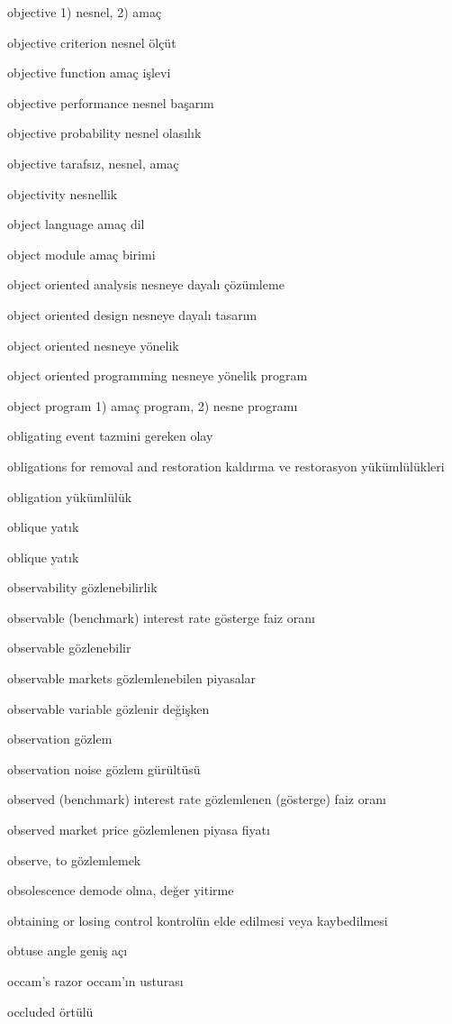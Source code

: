 \documentclass[12pt,fleqn]{article}\usepackage{../../common}
\begin{document}
objective 1) nesnel, 2) amaç

objective criterion nesnel ölçüt

objective function amaç işlevi

objective performance nesnel başarım

objective probability nesnel olasılık

objective tarafsız, nesnel, amaç

objectivity nesnellik

object language amaç dil

object module amaç birimi

object oriented analysis nesneye dayalı çözümleme

object oriented design nesneye dayalı tasarım

object oriented nesneye yönelik

object oriented programming nesneye yönelik program

object program 1) amaç program, 2) nesne programı

obligating event tazmini gereken olay

obligations for removal and restoration kaldırma ve restorasyon yükümlülükleri

obligation yükümlülük

oblique yatık

oblique yatık

observability gözlenebilirlik

observable (benchmark) interest rate gösterge faiz oranı

observable gözlenebilir

observable markets gözlemlenebilen piyasalar

observable variable gözlenir değişken

observation gözlem

observation noise gözlem gürültüsü

observed (benchmark) interest rate gözlemlenen (gösterge) faiz oranı

observed market price gözlemlenen piyasa fiyatı

observe, to gözlemlemek

obsolescence demode olma, değer yitirme

obtaining or losing control kontrolün elde edilmesi veya kaybedilmesi

obtuse angle geniş açı

occam's razor occam'ın usturası

occluded örtülü
\end{document}

